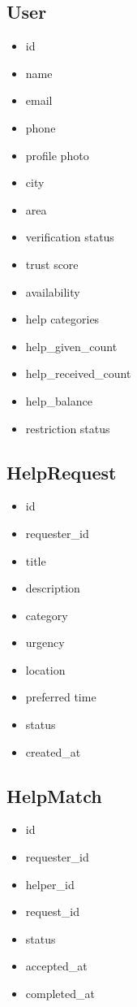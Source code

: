 \documentclass[11pt]{article}
\begin{document}
\subsection{User}
\begin{itemize}[leftmargin=1.5em]
    \item id
    \item name
    \item email
    \item phone
    \item profile photo
    \item city
    \item area
    \item verification status
    \item trust score
    \item availability
    \item help categories
    \item help\_given\_count
    \item help\_received\_count
    \item help\_balance
    \item restriction status
\end{itemize}

\subsection{HelpRequest}
\begin{itemize}[leftmargin=1.5em]
    \item id
    \item requester\_id
    \item title
    \item description
    \item category
    \item urgency
    \item location
    \item preferred time
    \item status
    \item created\_at
\end{itemize}

\subsection{HelpMatch}
\begin{itemize}[leftmargin=1.5em]
    \item id
    \item requester\_id
    \item helper\_id
    \item request\_id
    \item status
    \item accepted\_at
    \item completed\_at
\end{itemize}
\end{document}
